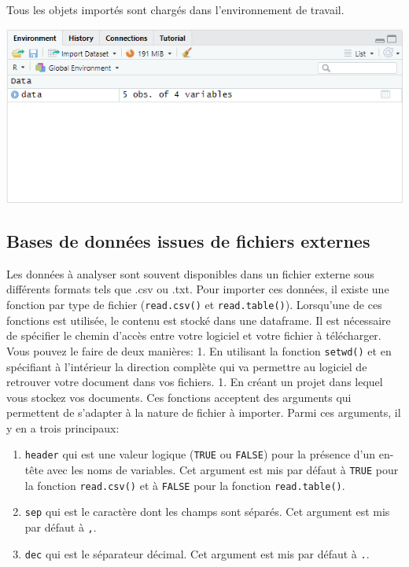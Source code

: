 \documentclass[
]{book}
\providecommand{\tightlist}{%
  \setlength{\itemsep}{0pt}\setlength{\parskip}{0pt}}
\begin{document}
Tous les objets importés sont chargés dans l'environnement de travail.

\includegraphics[width=8.47in]{images/environment_forRDataDownload}

\subsection{Bases de données issues de fichiers externes}\label{bases-de-donnuxe9es-issues-de-fichiers-externes}

Les données à analyser sont souvent disponibles dans un fichier externe sous différents formats tels que .csv ou .txt. Pour importer ces données, il existe une fonction par type de fichier (\texttt{read.csv()} et \texttt{read.table()}). Lorsqu'une de ces fonctions est utilisée, le contenu est stocké dans une dataframe. Il est nécessaire de spécifier le chemin d'accès entre votre logiciel et votre fichier à télécharger. Vous pouvez le faire de deux manières:
1. En utilisant la fonction \texttt{setwd()} et en spécifiant à l'intérieur la direction complète qui va permettre au logiciel de retrouver votre document dans vos fichiers.
1. En créant un projet dans lequel vous stockez vos documents.
Ces fonctions acceptent des arguments qui permettent de s'adapter à la nature de fichier à importer. Parmi ces arguments, il y en a trois principaux:

\begin{enumerate}
\def\labelenumi{\arabic{enumi}.}
\tightlist
\item
  \texttt{header} qui est une valeur logique (\texttt{TRUE} ou \texttt{FALSE}) pour la présence d'un en-tête avec les noms de variables. Cet argument est mis par défaut à \texttt{TRUE} pour la fonction \texttt{read.csv()} et à \texttt{FALSE} pour la fonction \texttt{read.table()}.
\item
  \texttt{sep} qui est le caractère dont les champs sont séparés. Cet argument est mis par défaut à \texttt{,}.
\item
  \texttt{dec} qui est le séparateur décimal. Cet argument est mis par défaut à \texttt{.}.
\end{enumerate}
\end{document}
